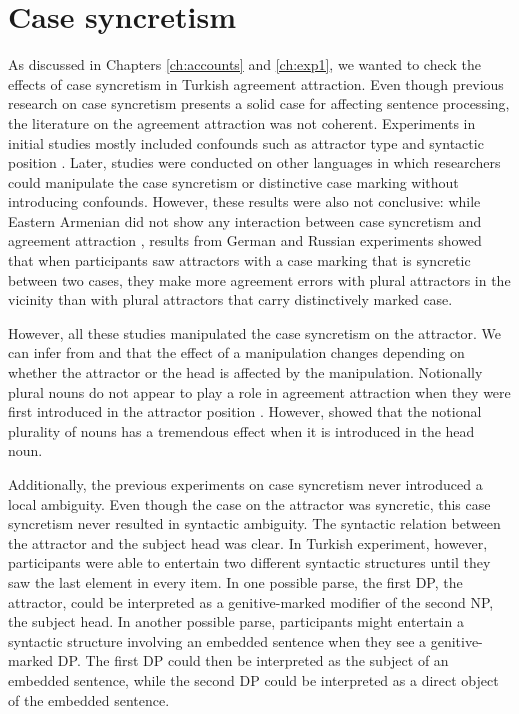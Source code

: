 \section{Case syncretism} \label{ch6case}

As discussed in Chapters \ref{ch:accounts} and \ref{ch:exp1}, we wanted to check the effects of case syncretism in Turkish agreement attraction. Even though previous research on case syncretism presents a solid case for affecting sentence processing, the literature on the agreement attraction was not coherent. Experiments in initial studies mostly included confounds such as attractor type \citep[][in Dutch]{HartsuikerEtAl2003} and syntactic position \citep[][in French]{FranckEtAl2006}. Later, studies were conducted on other languages in which researchers could manipulate the case syncretism or distinctive case marking without introducing confounds. However, these results were also not conclusive: while Eastern Armenian did not show any interaction between case syncretism and agreement attraction \citep{AvetisyanEtAl:2020}, results from German and Russian experiments showed that when participants saw attractors with a case marking that is syncretic between two cases, they make more agreement errors with plural attractors in the vicinity than with plural attractors that carry distinctively marked case.

However, all these studies manipulated the case syncretism on the attractor. We can infer from  and  that the effect of a manipulation changes depending on whether the attractor or the head is affected by the manipulation. Notionally plural nouns do not appear to play a role in agreement attraction when they were first introduced in the attractor position \citep{BockEberhard93}. However,  showed that the notional plurality of nouns has a tremendous effect when it is introduced in the head noun.

Additionally, the previous experiments on case syncretism never introduced a local ambiguity. Even though the case on the attractor was syncretic, this case syncretism never resulted in syntactic ambiguity. The syntactic relation between the attractor and the subject head was clear. In \cites{LagoEtAl2019} Turkish experiment, however, participants were able to entertain two different syntactic structures until they saw the last element in every item. In one possible parse, the first DP, the attractor, could be interpreted as a genitive-marked modifier of the second NP, the subject head. In another possible parse, participants might entertain a syntactic structure involving an embedded sentence when they see a genitive-marked DP. The first DP could then be interpreted as the subject of an embedded sentence, while the second DP could be interpreted as a direct object of the embedded sentence.  

